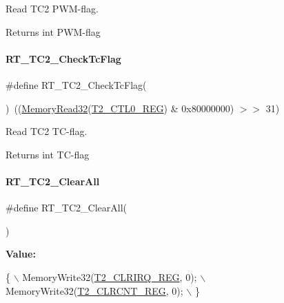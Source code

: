 Read T\+C2 P\+W\+M-\/flag. 

\begin{DoxyReturn}{Returns}
int P\+W\+M-\/flag 
\end{DoxyReturn}
\mbox{\label{a00047_ab9c273f7aaa4570b2a179b6711a50741}} 
\paragraph{\texorpdfstring{R\+T\+\_\+\+T\+C2\+\_\+\+Check\+Tc\+Flag}{RT\_TC2\_CheckTcFlag}}
{\footnotesize\ttfamily \#define R\+T\+\_\+\+T\+C2\+\_\+\+Check\+Tc\+Flag(\begin{DoxyParamCaption}{ }\end{DoxyParamCaption})~((\mbox{\hyperlink{a00020_a2d484dc15bdf30ee11ab3b05f31f0e16}{Memory\+Read32}}(\mbox{\hyperlink{a00020_adadaa0ab1ebbd7ba9b70dfd24c3ed44daf2e9deb36631241181cbf09e8d959475}{T2\+\_\+\+C\+T\+L0\+\_\+\+R\+EG}}) \& 0x80000000) $>$$>$ 31)}



Read T\+C2 T\+C-\/flag. 

\begin{DoxyReturn}{Returns}
int T\+C-\/flag 
\end{DoxyReturn}
\mbox{\label{a00047_a6b71644043f022558ee65f6197d0fe5d}} 
\paragraph{\texorpdfstring{R\+T\+\_\+\+T\+C2\+\_\+\+Clear\+All}{RT\_TC2\_ClearAll}}
{\footnotesize\ttfamily \#define R\+T\+\_\+\+T\+C2\+\_\+\+Clear\+All(\begin{DoxyParamCaption}{ }\end{DoxyParamCaption})}

{\bfseries Value\+:}
\begin{DoxyCode}
\{                                    \(\backslash\)
        MemoryWrite32(\mbox{\hyperlink{a00020_adadaa0ab1ebbd7ba9b70dfd24c3ed44da505b90f4de2b8b5b23d7154861265863}{T2\_CLRIRQ\_REG}}, 0); \(\backslash\)
        MemoryWrite32(\mbox{\hyperlink{a00020_adadaa0ab1ebbd7ba9b70dfd24c3ed44da9b4ab7bd6ab1e6514a439bd0056fb099}{T2\_CLRCNT\_REG}}, 0); \(\backslash\)
    \}
\end{DoxyCode}



